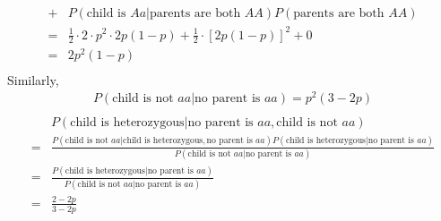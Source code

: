 \documentclass[10.5pt]{article}
\begin{document}
\begin{enumerate}[(a)]
\begin{align*}
		+& P(\text{child is $Aa$}|\text{parents are both $AA$})P(\text{parents are both $AA$})\\[8pt]
		=&\frac{1}{2}\cdot2\cdot p^2\cdot2p(1-p)+\frac{1}{2}\cdot\left[2p(1-p)\right]^2+0\\[8pt]
		=& 2p^2(1-p)\\[8pt]
	\end{align*}
	Similarly, 
	\begin{align*}
		P(\text{child is not $aa$}|\text{no parent is $aa$}) = p^2(3-2p)\\[8pt]
	\end{align*}
	\begin{align*}
		&P(\text{child is heterozygous}|\text{no parent is $aa$},\text{child is not $aa$})\\[8pt]
		=&\frac{P(\text{child is not $aa$}|\text{child is heterozygous}, \text{no parent is $aa$})P(\text{child is heterozygous}|\text{no parent is $aa$})}{P(\text{child is not $aa$}|\text{no parent is $aa$})}\\[8pt]
		=&\frac{P(\text{child is heterozygous}|\text{no parent is $aa$})}{P(\text{child is not $aa$}|\text{no parent is $aa$})}\\[8pt]
		=&\frac{2-2p}{3-2p}
	\end{align*}
\end{enumerate}
\end{document}
